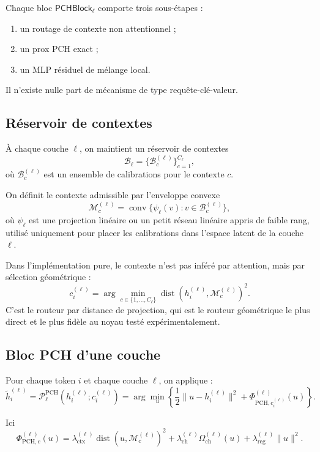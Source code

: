 \documentclass[11pt]{article}
\providecommand{\Ppch}{\mathcal P^{\mathrm{PCH}}}
\begin{document}
Chaque bloc \(\mathsf{PCHBlock}_\ell\) comporte trois sous-étapes :
\begin{enumerate}[leftmargin=2em]
    \item un routage de contexte non attentionnel ;
    \item un prox PCH exact ;
    \item un MLP résiduel de mélange local.
\end{enumerate}

Il n'existe nulle part de mécanisme de type requête-clé-valeur.

\subsection{Réservoir de contextes}

À chaque couche \(\ell\), on maintient un réservoir de contextes
\[
\mathcal B_\ell = \{\mathcal B^{(\ell)}_c\}_{c=1}^{C_\ell},
\]
où \(\mathcal B^{(\ell)}_c\) est un ensemble de calibrations pour le contexte \(c\).

On définit le contexte admissible par l'enveloppe convexe
\[
\mathcal M^{(\ell)}_c
=
\operatorname{conv}\{\psi_\ell(v): v\in \mathcal B^{(\ell)}_c\},
\]
où \(\psi_\ell\) est une projection linéaire ou un petit réseau linéaire appris de faible rang, utilisé uniquement pour placer les calibrations dans l'espace latent de la couche \(\ell\).

Dans l'implémentation pure, le contexte n'est pas inféré par attention, mais par sélection géométrique :
\[
c_i^{(\ell)}
=
\arg\min_{c\in\{1,\dots,C_\ell\}}
\operatorname{dist}\!\left(h_i^{(\ell)}, \mathcal M^{(\ell)}_c\right)^2.
\]
C'est le routeur par distance de projection, qui est le routeur géométrique le plus direct et le plus fidèle au noyau testé expérimentalement.

\subsection{Bloc PCH d'une couche}

Pour chaque token \(i\) et chaque couche \(\ell\), on applique :
\[
\tilde h_i^{(\ell)}
=
\Ppch_\ell\!\left(h_i^{(\ell)}; c_i^{(\ell)}\right)
=
\arg\min_u
\left\{
\frac12\|u-h_i^{(\ell)}\|^2
+
\Phi_{\mathrm{PCH},c_i^{(\ell)}}^{(\ell)}(u)
\right\}.
\]

Ici
\[
\Phi_{\mathrm{PCH},c}^{(\ell)}(u)
=
\lambda_{\mathrm{ctx}}^{(\ell)}
\operatorname{dist}(u,\mathcal M_c^{(\ell)})^2
+
\lambda_{\mathrm{ch}}^{(\ell)}\Omega_{\mathrm{ch}}^{(\ell)}(u)
+
\lambda_{\mathrm{reg}}^{(\ell)}\|u\|^2.
\]
\end{document}
